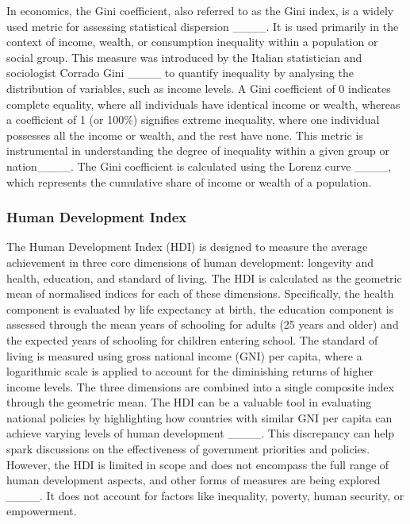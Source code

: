 In economics, the Gini coefficient, also referred to as the Gini index, is a widely used metric for assessing statistical dispersion ____. It is used primarily in the context of income, wealth, or consumption inequality within a population or social group. This measure was introduced by the Italian statistician and sociologist Corrado Gini ____ to quantify inequality by analysing the distribution of variables, such as income levels. A Gini coefficient of 0 indicates complete equality, where all individuals have identical income or wealth, whereas a coefficient of 1 (or 100\%) signifies extreme inequality, where one individual possesses all the income or wealth, and the rest have none. This metric is instrumental in understanding the degree of inequality within a given group or nation____. The Gini coefficient is calculated using the Lorenz curve ____, which represents the cumulative share of income or wealth of a population.  

\subsubsection{Human Development Index}

The Human Development Index (HDI) is designed to measure the average achievement in three core dimensions of human development: longevity and health, education, and standard of living. The HDI is calculated as the geometric mean of normalised indices for each of these dimensions. Specifically, the health component is evaluated by life expectancy at birth, the education component is assessed through the mean years of schooling for adults (25 years and older) and the expected years of schooling for children entering school. The standard of living is measured using gross national income (GNI) per capita, where a logarithmic scale is applied to account for the diminishing returns of higher income levels. The three dimensions are combined into a single composite index through the geometric mean. The HDI can be a valuable tool in evaluating national policies by highlighting how countries with similar GNI per capita can achieve varying levels of human development ____. This discrepancy can help spark discussions on the effectiveness of government priorities and policies. However, the HDI is limited in scope and does not encompass the full range of human development aspects, and other forms of measures are being explored ____. It does not account for factors like inequality, poverty, human security, or empowerment.